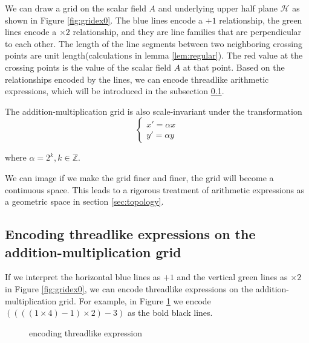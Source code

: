 We can draw a grid on the scalar field $A$ and underlying upper half plane $\mathcal{H}$ as shown in Figure \ref{fig:gridex0}.
The blue lines encode a $+ 1$ relationship, the green lines encode a $\times 2$ relationship,
and they are line families that are perpendicular to each other.
The length of the line segments between two neighboring crossing points are unit length(calculations in lemma \ref{lem:regular}).
The red value at the crossing points is the value of the scalar field $A$ at that point.
Based on the relationships encoded by the lines, we can encode threadlike arithmetic expressions,
which will be introduced in the subsection \ref{sec:encoding}.

The addition-multiplication grid is also scale-invariant under the transformation
$$
\begin{cases}
x' = \alpha x\\
y' = \alpha y
\end{cases}
$$

where $\alpha = 2^k , k \in \mathbb{Z}$.

We can image if we make the grid finer and finer, the grid will become a continuous space.
This leads to a rigorous treatment of arithmetic expressions as a geometric space in section \ref{sec:topology}.

\subsection{Encoding threadlike expressions on the addition-multiplication grid}\label{sec:encoding}

If we interpret the horizontal blue lines as $+ 1$ and the vertical green lines as $\times 2$ in Figure \ref{fig:gridex0},
we can encode threadlike expressions on the addition-multiplication grid. For example, in Figure \ref{fig:encoding}
we encode $((((1 \times 4) - 1) \times 2) - 3)$ as the bold black lines.

\begin{figure}[ht]
\centering
{}
\caption{encoding threadlike expression}\label{fig:encoding}
\end{figure}


